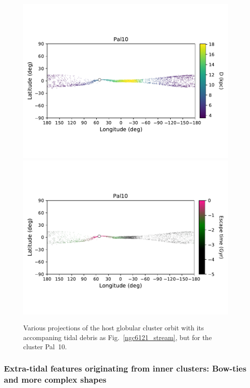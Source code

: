 \begin{figure}
\begin{center}
                    \includegraphics[clip=true, trim = 0mm 20mm 0mm 10mm, width=\columnwidth]{images/PII_individual_Pal10_Pal10_LB_D.pdf}
                    \includegraphics[clip=true, trim = 0mm 20mm 0mm 10mm, width=\columnwidth]{images/PII_individual_Pal10_Pal10_LB_tesc.pdf}
                \end{center}
                \caption[]{Various projections of the host globular cluster orbit with its accompaning tidal debris as Fig.~\ref{ngc6121_stream}, but for the cluster Pal~10. \label{pal10_stream}}
            \end{figure}
            \onecolumn  
            
        \subsubsection{Extra-tidal features originating from inner clusters: Bow-ties and more complex shapes}

